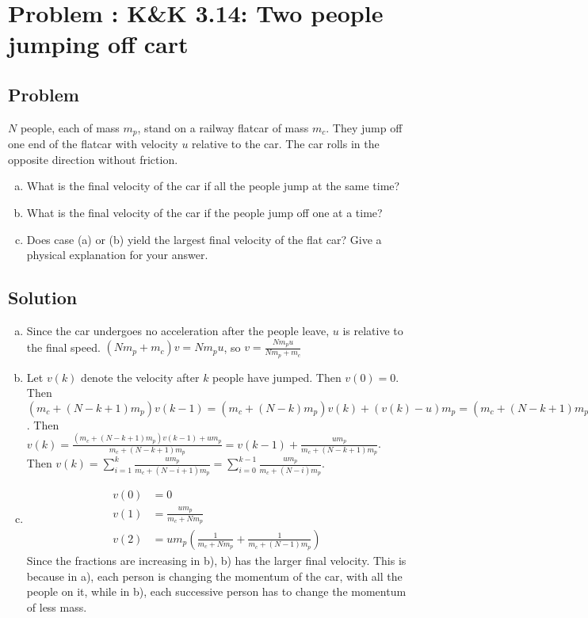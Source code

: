 \documentclass[solutions]{esg8012pset}
\date{October 1}
\begin{document}
\section{Problem \thesection: K\&K 3.14: Two people jumping off cart}
\subsection{Problem}
  $N$ people, each of mass $m_p$, stand on a railway flatcar of mass $m_c$. They jump off one end of the flatcar with velocity $u$ relative to the car. The car rolls in the opposite direction without friction.
  \begin{enumerate}[(a)]
    \item What is the final velocity of the car if all the people jump at the same time?
    \item What is the final velocity of the car if the people jump off one at a time?
    \item Does case (a) or (b) yield the largest final velocity of the flat car?  Give a physical explanation for your answer.
  \end{enumerate}
\subsection{Solution}
  \begin{enumerate}[a)]
    \item Since the car undergoes no acceleration after the people leave, $u$ is relative to the final speed.  $(N m_p + m_c)v = N m_p u$, so $v = \frac{N m_p u}{N m_p + m_c}$
    \item Let $v(k)$ denote the velocity after $k$ people have jumped.  Then $v(0) = 0$.  Then $(m_c + (N - k + 1)m_p)v(k - 1) = (m_c + (N - k)m_p)v(k) + (v(k) - u) m_p = (m_c + (N - k + 1)m_p)v(k)  - u m_p$.  Then $v(k) = \frac{(m_c + (N - k + 1)m_p)v(k - 1) + u m_p}{m_c + (N - k + 1)m_p} = v(k - 1) + \frac{u m_p}{m_c + (N - k + 1)m_p}$.  Then $v(k) = \sum_{i=1}^{k} \frac{u m_p}{m_c + (N - i + 1)m_p} = \sum_{i=0}^{k-1} \frac{u m_p}{m_c + (N - i)m_p}$.
    \item \begin{align*} v(0) & = 0 \\
      v(1) & = \frac{u m_p}{m_c + N m_p} \\
      v(2) & = u m_p\left(\frac{1}{m_c + N m_p} + \frac{1}{m_c + (N - 1) m_p}\right)
    \end{align*} Since the fractions are increasing in b), b) has the larger final velocity.  This is because in a), each person is changing the momentum of the car, with all the people on it, while in b), each successive person has to change the momentum of less mass.
  \end{enumerate}
\end{document}
